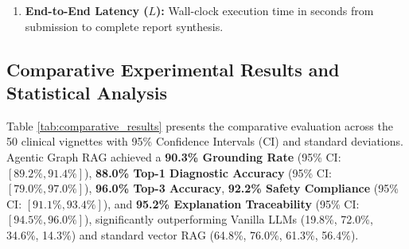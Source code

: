 \documentclass[journal,10pt,twocolumn]{IEEEtran}
\begin{document}
\begin{enumerate}
\begin{itemize}
        \item \textit{Criterion 4 (Contradictory Evidence Visibility):} Active disclosure of conflicting clinical trial findings or clinical ambiguities ($0$--$20\%$).
        \item \textit{Criterion 5 (Safety Traceability):} Complete deterministic audit trail explaining why contraindicated medications were flagged and alternative regimens suggested ($0$--$20\%$).
    \end{itemize}
    We note that $ET$ assesses structural compliance with evidentiary provenance schemas and reflects structural divergence when applied to unstructured baseline texts.
    \item \textbf{End-to-End Latency ($L$):} Wall-clock execution time in seconds from submission to complete report synthesis.
\end{enumerate}

\subsection{Comparative Experimental Results and Statistical Analysis}
Table \ref{tab:comparative_results} presents the comparative evaluation across the 50 clinical vignettes with 95\% Confidence Intervals (CI) and standard deviations. Agentic Graph RAG achieved a \textbf{90.3\% Grounding Rate} (95\% CI: $[89.2\%, 91.4\%]$), \textbf{88.0\% Top-1 Diagnostic Accuracy} (95\% CI: $[79.0\%, 97.0\%]$), \textbf{96.0\% Top-3 Accuracy}, \textbf{92.2\% Safety Compliance} (95\% CI: $[91.1\%, 93.4\%]$), and \textbf{95.2\% Explanation Traceability} (95\% CI: $[94.5\%, 96.0\%]$), significantly outperforming Vanilla LLMs (19.8\%, 72.0\%, 34.6\%, 14.3\%) and standard vector RAG (64.8\%, 76.0\%, 61.3\%, 56.4\%).
\end{document}
